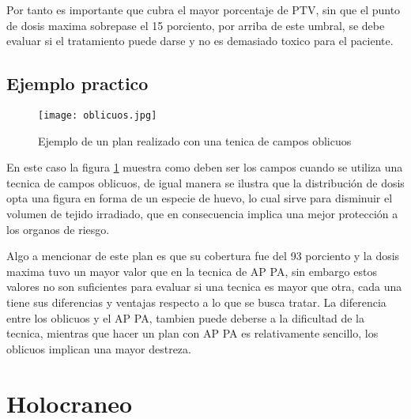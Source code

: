 \documentclass{article}
\begin{document}
\vspace{10pt}


Por tanto es importante que cubra el mayor porcentaje de PTV, sin que el punto de dosis maxima sobrepase el 15 porciento, por arriba de este umbral, se debe evaluar si el tratamiento puede darse y no es demasiado toxico para el paciente.

\vspace{10pt}



\subsection{Ejemplo practico}

\begin{figure}[h!]
    \centering
    \texttt{[image: oblicuos.jpg]}
    \caption{Ejemplo de un plan realizado con una tenica de campos oblicuos}
    \label{a2}
\end{figure}


En este caso la figura \ref{a2} muestra como deben ser los campos cuando se utiliza una tecnica de campos oblicuos, de igual manera se ilustra que la distribución de dosis opta una figura en forma de un especie de huevo, lo cual sirve para disminuir el volumen de tejido irradiado, que en consecuencia implica una mejor protección a los organos de riesgo. 

\vspace{10pt}

Algo a mencionar de este plan es que su cobertura fue del 93 porciento y la dosis maxima tuvo un mayor valor que en la tecnica de AP PA, sin embargo estos valores no son suficientes para evaluar si una tecnica es mayor que otra, cada una tiene sus diferencias y ventajas respecto a lo que se busca tratar. La diferencia entre los oblicuos y el AP PA, tambien puede deberse a la dificultad de la tecnica, mientras que hacer un plan con AP PA es relativamente sencillo, los oblicuos implican una mayor destreza. 


\section{Holocraneo}
\end{document}
